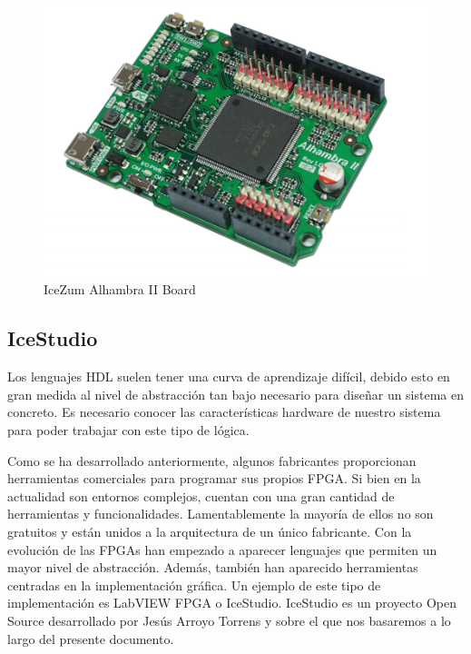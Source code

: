 \begin{center}
	\begin{figure}[H]
		\center
		\includegraphics[scale=0.5]{imagenes/EstadoArte/IceZumAlhambra.PNG}
		\caption{IceZum Alhambra II Board}
		\label{fig: IceZumAlhambraII}
	\end{figure} 
\end{center}


\subsection{IceStudio}
Los lenguajes HDL suelen tener una curva de aprendizaje difícil, debido esto en gran medida al nivel de abstracción tan bajo necesario para diseñar un sistema en concreto. Es necesario conocer las características hardware de nuestro sistema para poder trabajar con este tipo de lógica. \newline

Como se ha desarrollado anteriormente, algunos fabricantes proporcionan herramientas comerciales para programar sus propios FPGA. Si bien en la actualidad son entornos complejos, cuentan con una gran cantidad de herramientas y funcionalidades. Lamentablemente la mayoría de ellos no son gratuitos y están unidos a la arquitectura de un único fabricante.
\newline
Con la evolución de las FPGAs han empezado a aparecer lenguajes que permiten un mayor nivel de abstracción. 
Además, también han aparecido herramientas centradas en la implementación gráfica. Un ejemplo de este tipo de implementación es LabVIEW FPGA o IceStudio. \newline
IceStudio es un proyecto Open Source desarrollado por Jesús Arroyo Torrens y sobre el que nos basaremos a lo largo del presente documento. \newline

